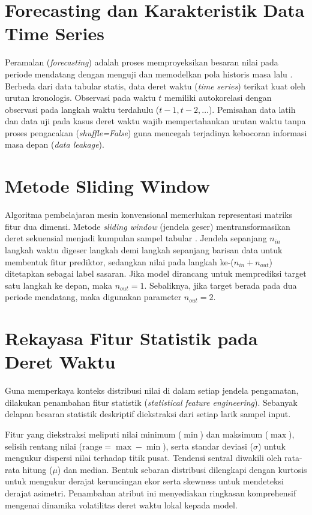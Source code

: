 \documentclass[a4paper,oneside,12pt]{report}
\begin{document}
\section{Forecasting dan Karakteristik Data Time Series}
Peramalan (\textit{forecasting}) adalah proses memproyeksikan besaran nilai pada periode mendatang dengan menguji dan memodelkan pola historis masa lalu \cite{ref_vimala}. Berbeda dari data tabular statis, data deret waktu (\textit{time series}) terikat kuat oleh urutan kronologis. Observasi pada waktu $t$ memiliki autokorelasi dengan observasi pada langkah waktu terdahulu ($t-1, t-2, \dots$). Pemisahan data latih dan data uji pada kasus deret waktu wajib mempertahankan urutan waktu tanpa proses pengacakan (\textit{shuffle=False}) guna mencegah terjadinya kebocoran informasi masa depan (\textit{data leakage}).

\section{Metode Sliding Window}
Algoritma pembelajaran mesin konvensional memerlukan representasi matriks fitur dua dimensi. Metode \textit{sliding window} (jendela geser) mentransformasikan deret sekuensial menjadi kumpulan sampel tabular \cite{ref_han}. Jendela sepanjang $n_{in}$ langkah waktu digeser langkah demi langkah sepanjang barisan data untuk membentuk fitur prediktor, sedangkan nilai pada langkah ke-($n_{in} + n_{out}$) ditetapkan sebagai label sasaran. Jika model dirancang untuk memprediksi target satu langkah ke depan, maka $n_{out} = 1$. Sebaliknya, jika target berada pada dua periode mendatang, maka digunakan parameter $n_{out} = 2$.

\section{Rekayasa Fitur Statistik pada Deret Waktu}
Guna memperkaya konteks distribusi nilai di dalam setiap jendela pengamatan, dilakukan penambahan fitur statistik (\textit{statistical feature engineering}). Sebanyak delapan besaran statistik deskriptif diekstraksi dari setiap larik sampel input. 

Fitur yang diekstraksi meliputi nilai minimum ($\min$) dan maksimum ($\max$), selisih rentang nilai ($\text{range} = \max - \min$), serta standar deviasi ($\sigma$) untuk mengukur dispersi nilai terhadap titik pusat. Tendensi sentral diwakili oleh rata-rata hitung ($\mu$) dan median. Bentuk sebaran distribusi dilengkapi dengan kurtosis untuk mengukur derajat keruncingan ekor serta skewness untuk mendeteksi derajat asimetri. Penambahan atribut ini menyediakan ringkasan komprehensif mengenai dinamika volatilitas deret waktu lokal kepada model.
\end{document}
